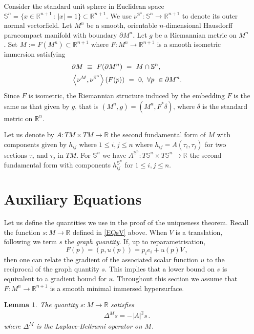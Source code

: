 \documentclass[10pt]{amsart}
\newcommand{\IP}[2]{\left< #1 , #2 \right>}
\newcommand{\R}{\ensuremath{\mathbb{R}}}
\renewcommand{\S}{\ensuremath{\mathbb{S}}}
\newtheorem{lem}[thm]{Lemma}
\theoremstyle{remark}
\begin{document}
Consider the standard unit sphere in Euclidean space $\S^n = \{x\in\R^{n+1}\,:\,|x|=1\}\subset
\R^{n+1}$.
We use $\nu^{\S^n}:\S^{n}\rightarrow\R^{n+1}$ to denote its outer
normal vectorfield.
Let $M^n$ be a smooth, orientable $n$-dimensional Hausdorff paracompact manifold with boundary $\partial M^n$.
Let $g$ be a Riemannian metric on $M^n$.
Set $M:=F(M^n)\subset{\R}^{n+1}$ where $F:M^n\rightarrow {\R}^{n+1}$ is a
smooth isometric immersion satisfying
\begin{align}
&{\partial} M \ \equiv \ F({\partial} M^n)\ =\ M \cap \S^n,\notag\\
&\IP{{\nu}^M}{{\nu}^{\S^n}}(F(p))\ =\ 0, \text{ }\forall
p~\in{\partial} M^n.
\label{initial}
\end{align}
Since $F$ is isometric, the Riemannian structure induced by the embedding $F$
is the same as that given by $g$, that is $(M^n, g) = (M^n, F^*\delta)$, where
$\delta$ is the standard metric on $\R^n$.

Let us denote by $A:T M\times T M \rightarrow \R$ the second fundamental form
of $M$ with components given by $h_{ij}$ where $1\leq i,j\leq n$ where $h_{ij}=
A(\tau_i,\tau_j)$ for two sections $\tau_i$ and $\tau_j$ in $TM$.
For $\S^n$ we have $A^{\S^n}:T \S^n \times T\S^n\rightarrow \R$ the
second fundamental form with components $h^{\S^n}_{ij}$ for $1\leq i,j\leq
n$.

\section{Auxiliary Equations}%

Let us define the quantities we use in the proof of the uniqueness theorem.
Recall the function $s:M\rightarrow\R$ defined in \eqref{EQsV} above.
When $V$ is a translation, following \cite{ecker1989mce} we term $s$ the \emph{graph quantity}.
If, up to reparametrisation,
\[
F(p) = (p,u(p)) = p_ie_i + u(p)V\,,
\]
then one can relate the gradient of the associated scalar function $u$ to the
reciprocal of the graph quantity $s$. This implies that a lower bound on $s$
is equivalent to a gradient bound for $u$.
Throughout this section we assume that $F:M^n\rightarrow\R^{n+1}$ is a smooth
minimal immersed hypersurface.

\begin{lem} The quantity $s:M\rightarrow\R$
satisfies
\begin{align*}
{\Delta}^M s = - |A|^2 s\,.
\end{align*}
where $\Delta^M$ is the Laplace-Beltrami operator on $M$.
\label{sevolution}
\end{lem}
\end{document}
